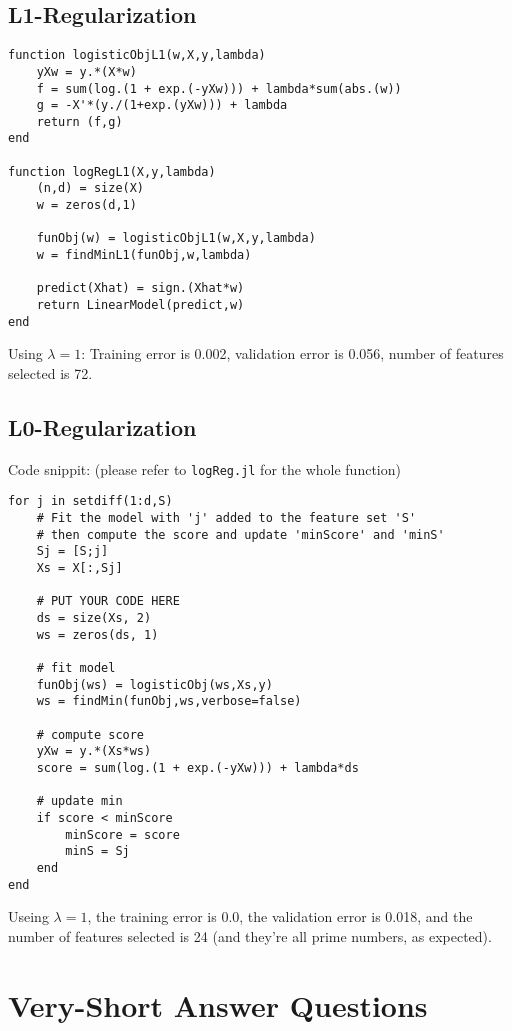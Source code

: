 \documentclass{article}
\begin{document}
\subsection{L1-Regularization}

\begin{verbatim}
function logisticObjL1(w,X,y,lambda)
    yXw = y.*(X*w)
    f = sum(log.(1 + exp.(-yXw))) + lambda*sum(abs.(w))
    g = -X'*(y./(1+exp.(yXw))) + lambda
    return (f,g)
end

function logRegL1(X,y,lambda)
    (n,d) = size(X)
    w = zeros(d,1)

    funObj(w) = logisticObjL1(w,X,y,lambda)
    w = findMinL1(funObj,w,lambda)

    predict(Xhat) = sign.(Xhat*w)
    return LinearModel(predict,w)
end
\end{verbatim}
 Using $\lambda = 1$: Training error is 0.002, validation error is 0.056, number of features selected is 72.


\subsection{L0-Regularization}

Code snippit: (please refer to \texttt{logReg.jl} for the whole function)
\begin{verbatim}
for j in setdiff(1:d,S)
    # Fit the model with 'j' added to the feature set 'S'
    # then compute the score and update 'minScore' and 'minS'
    Sj = [S;j]
    Xs = X[:,Sj]

    # PUT YOUR CODE HERE
    ds = size(Xs, 2)
    ws = zeros(ds, 1)

    # fit model
    funObj(ws) = logisticObj(ws,Xs,y)
    ws = findMin(funObj,ws,verbose=false)

    # compute score
    yXw = y.*(Xs*ws)
    score = sum(log.(1 + exp.(-yXw))) + lambda*ds

    # update min
    if score < minScore
        minScore = score
        minS = Sj
    end
end
\end{verbatim}

Useing $\lambda = 1$, the training error is 0.0, the validation error is 0.018, and the number of features selected is 24 (and they're all prime numbers, as expected).

\section{Very-Short Answer Questions}
\end{document}
